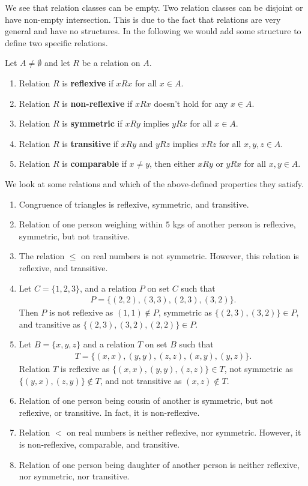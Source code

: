 \documentclass[a4paper,english,12pt]{article}
\begin{document}
We see that relation classes can be empty. Two relation classes can be disjoint or have non-empty intersection. This is due to the fact that relations are very general and have no structures. In the following we would add some structure to define two specific relations.
\begin{defn} Let $A \neq \emptyset$ and let $R$ be a relation on $A$.
	\begin{enumerate}
		\item Relation $R$ is \textbf{reflexive} if $xRx$ for all $x \in A$.
		\item Relation $R$ is \textbf{non-reflexive} if $xRx$ doesn't hold for any $x \in A$.
		\item Relation $R$ is \textbf{symmetric} if $xRy$ implies $yRx$ for all $x \in A$.
		\item Relation $R$ is \textbf{transitive} if $xRy$ and $yRz$ implies $xRz$ for all $x,y,z \in A$.
		\item Relation $R$ is \textbf{comparable} if $x \neq y$, then either $xRy$ or $yRx$ for all $x,y \in A$.
	\end{enumerate}
\end{defn}
\begin{exmp} We look at some relations and which of the above-defined properties they satisfy. 
\begin{enumerate}
	\item Congruence of triangles is reflexive, symmetric, and transitive.
	\item Relation of one person weighing within $5$ kgs of another person is reflexive, symmetric, but not transitive.
	\item The relation $\leq$ on real numbers is not symmetric. However, this relation is reflexive, and transitive. 
	\item Let $C=\{1,2,3\}$, and a relation $P$ on set $C$ such that 
	\begin{align*}
	P=\{(2,2),(3,3),(2,3),(3,2)\}.
	\end{align*}
	Then $P$ is not reflexive as $(1,1) \notin P$, symmetric as $\{(2,3),(3,2)\} \in P$, and transitive as $\{(2,3),(3,2),(2,2)\} \in P$.
	\item Let $B=\{x,y,z\}$ and a relation $T$ on set $B$ such that 
	\begin{align*}
	T = \{(x,x),(y,y),(z,z),(x,y),(y,z)\}.
	\end{align*}
	Relation $T$ is reflexive as $\{(x,x),(y,y),(z,z)\} \in T$, not symmetric as $\{(y,x),(z,y)\} \notin T$, and not transitive as $(x,z) \notin T$.
	\item Relation of one person being cousin of another is symmetric, but not reflexive, or transitive. In fact, it is non-reflexive.
	\item Relation $<$ on real numbers is neither reflexive, nor symmetric. However, it is non-reflexive, comparable, and transitive.
	\item Relation of one person being daughter of another person is neither reflexive, nor symmetric, nor transitive.
\end{enumerate}
\end{exmp}
\end{document}
